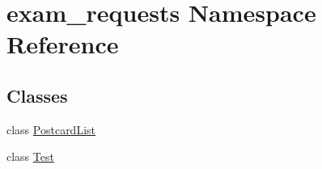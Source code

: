 \hypertarget{namespaceexam__requests}{}\section{exam\+\_\+requests Namespace Reference}
\label{namespaceexam__requests}
\subsection*{Classes}
\begin{DoxyCompactItemize}
\item 
class \mbox{\hyperlink{classexam__requests_1_1PostcardList}{Postcard\+List}}
\item 
class \mbox{\hyperlink{classexam__requests_1_1Test}{Test}}
\end{DoxyCompactItemize}


